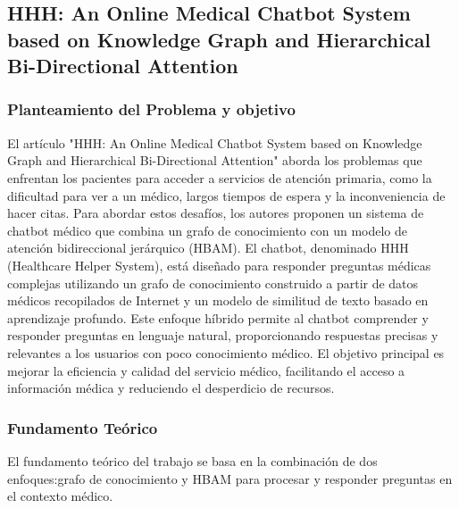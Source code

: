 
\subsection{HHH: An Online Medical Chatbot System based on Knowledge Graph and Hierarchical Bi-Directional Attention \citep*{HHHAnOnlineMedical}} %
	\subsubsection{Planteamiento del Problema y objetivo}
		El artículo "HHH: An Online Medical Chatbot System based on Knowledge Graph and Hierarchical Bi-Directional Attention" aborda los problemas que enfrentan los pacientes para acceder a servicios de atención primaria, como la dificultad para ver a un médico, largos tiempos de espera y la inconveniencia de hacer citas. Para abordar estos desafíos, los autores proponen un sistema de chatbot médico que combina un grafo de conocimiento con un modelo de atención bidireccional jerárquico (HBAM). El chatbot, denominado HHH (Healthcare Helper System), está diseñado para responder preguntas médicas complejas utilizando un grafo de conocimiento construido a partir de datos médicos recopilados de Internet y un modelo de similitud de texto basado en aprendizaje profundo. Este enfoque híbrido permite al chatbot comprender y responder preguntas en lenguaje natural, proporcionando respuestas precisas y relevantes a los usuarios con poco conocimiento médico. El objetivo principal es mejorar la eficiencia y calidad del servicio médico, facilitando el acceso a información médica y reduciendo el desperdicio de recursos.

	\subsubsection{Fundamento Teórico}
	El fundamento teórico del trabajo se basa en la combinación de dos enfoques:grafo de conocimiento y HBAM para procesar y responder preguntas en el contexto médico.
		
